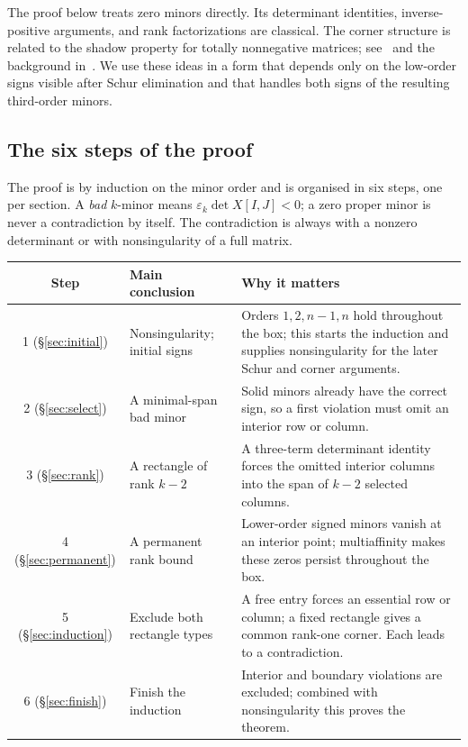 \documentclass[10pt,a4paper]{article}
\theoremstyle{definition}
\theoremstyle{remark}
\numberwithin{equation}{section}
\newcommand{\eps}{\varepsilon}
\begin{document}
The proof below treats zero minors directly. Its determinant identities,
inverse-positive arguments, and rank factorizations are classical.
The corner structure is related to the shadow property for totally
nonnegative matrices; see~\cite[Lemma~1.2]{AdmGarloff2013} and the
background in~\cite{FallatJohnson2011,Pinkus2010}. We use these ideas
in a form that depends only on the low-order signs visible after Schur
elimination and that handles both signs of the resulting third-order
minors.


\subsection{The six steps of the proof}\label{sec:roadmap}
The proof is by induction on the minor order and is organised in six
steps, one per section. A \emph{bad} $k$-minor means
$\eps_k\det X[I,J]<0$; a zero proper minor is never a contradiction by
itself. The contradiction is always with a nonzero determinant or with
nonsingularity of a full matrix.

\begin{center}\small
\begin{tabular}{@{}clp{86mm}@{}}
\toprule
Step & Main conclusion & Why it matters\\
\midrule
1 (\S\ref{sec:initial}) & Nonsingularity; initial signs & Orders $1,2,n-1,n$ hold throughout the box; this starts the induction and supplies nonsingularity for the later Schur and corner arguments.\\
2 (\S\ref{sec:select}) & A minimal-span bad minor & Solid minors already have the correct sign, so a first violation must omit an interior row or column.\\
3 (\S\ref{sec:rank}) & A rectangle of rank $k-2$ & A three-term determinant identity forces the omitted interior columns into the span of $k-2$ selected columns.\\
4 (\S\ref{sec:permanent}) & A permanent rank bound & Lower-order signed minors vanish at an interior point; multiaffinity makes these zeros persist throughout the box.\\
5 (\S\ref{sec:induction}) & Exclude both rectangle types & A free entry forces an essential row or column; a fixed rectangle gives a common rank-one corner. Each leads to a contradiction.\\
6 (\S\ref{sec:finish}) & Finish the induction & Interior and boundary violations are excluded; combined with nonsingularity this proves the theorem.\\
\bottomrule
\end{tabular}
\end{center}
\end{document}
